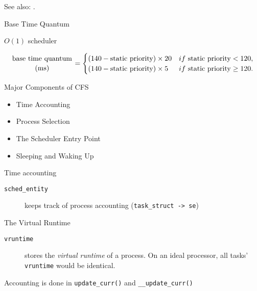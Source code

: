 See also: .

\begin{frame}{Base Time Quantum}
  \begin{block}{$O(1)$ scheduler}
    \begin{small}
      \begin{equation*}
        \genfrac{}{}{0pt}{}{\text{base time quantum}}{(\text{ms})}=
        \begin{cases}
          (140 - \text{static priority})\times{}20& if\ \text{static priority} < 120,\\
          (140 - \text{static priority})\times{}5& if\ \text{static priority} \ge 120.
        \end{cases}
      \end{equation*}
    \end{small}
  \end{block}
\end{frame}

\begin{frame}{Major Components of CFS}
  \begin{itemize}
  \item Time Accounting
  \item Process Selection
  \item The Scheduler Entry Point
  \item Sleeping and Waking Up
  \end{itemize}
\end{frame}

\begin{frame}{Time accounting}
  \begin{description}
  \item[\texttt{sched\_entity}] keeps track of process accounting (\texttt{task\_struct -> se})
  \end{description}
  \begin{center}
  \end{center}
\end{frame}

\begin{frame}
  \begin{block}{The Virtual Runtime}
    \begin{description}
    \item[\texttt{vruntime}] stores the \emph{virtual runtime} of a process. On an ideal
      processor, all tasks' \texttt{vruntime} would be identical.
    \end{description}
    Accounting is done in \texttt{update\_curr()} and \texttt{\_\_update\_curr()}
  \end{block}
\end{frame}


